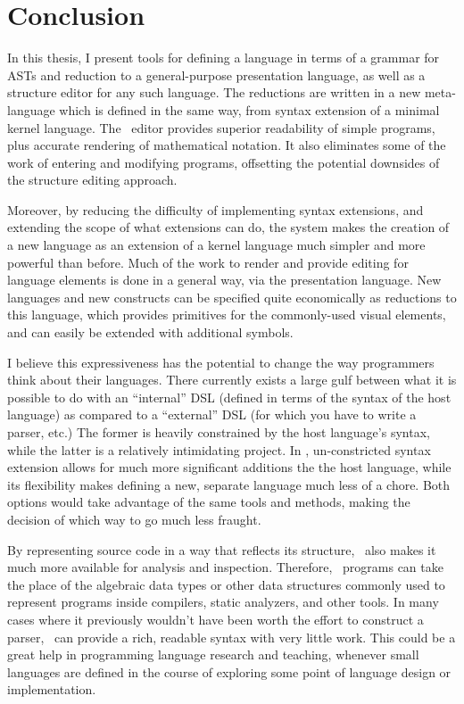 \chapter{Conclusion}

In this thesis, I present tools for defining a language in terms of a grammar for ASTs and reduction to a general-purpose presentation language, as well as a structure editor for any such language. The reductions are written in a new meta-language which is defined in the same way, from syntax extension of a minimal kernel language. The \Meta\ editor provides superior readability of simple programs, plus accurate rendering of mathematical notation. It also eliminates some of the work of entering and modifying programs, offsetting the potential downsides of the structure editing approach.

Moreover, by reducing the difficulty of implementing syntax extensions, and extending the scope of what extensions can do, the system makes the creation of a new language as an extension of a kernel language much simpler and more powerful than before. Much of the work to render and provide editing for language elements is done in a general way, via the presentation language. New languages and new constructs can be specified quite economically as reductions to this language, which provides primitives for the commonly-used visual elements, and can easily be extended with additional symbols.

I believe this expressiveness has the potential to change the way programmers think about their languages. There currently exists a large gulf between what it is possible to do with an ``internal'' DSL (defined in terms of the syntax of the host language) as compared to a ``external'' DSL (for which you have to write a parser, etc.) The former is heavily constrained by the host language's syntax, while the latter is a relatively intimidating project. In \Meta, un-constricted syntax extension allows for much more significant additions the the host language, while its flexibility makes defining a new, separate language much less of a chore. Both options would take advantage of the same tools and methods, making the decision of which way to go much less fraught.

By representing source code in a way that reflects its structure, \Meta\ also makes it much more available for analysis and inspection. Therefore, \Meta\ programs can take the place of the algebraic data types or other data structures commonly used to represent programs inside compilers, static analyzers, and other tools. In many cases where it previously wouldn't have been worth the effort to construct a parser, \Meta\ can provide a rich, readable syntax with very little work. This could be a great help in programming language research and teaching, whenever small languages are defined in the course of exploring some point of language design or implementation.

